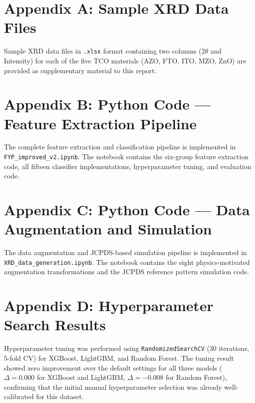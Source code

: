 \documentclass[12pt, oneside]{article} %
\begin{document}
\newpage


\begin{appendices}

\section*{Appendix A: Sample XRD Data Files}
\label{app:A}

Sample XRD data files in \texttt{.xlsx} format containing two columns ($2\theta$ and Intensity) for each of the five TCO materials (AZO, FTO, ITO, MZO, ZnO) are provided as supplementary material to this report.


\section*{Appendix B: Python Code --- Feature Extraction Pipeline}
\label{app:B}

The complete feature extraction and classification pipeline is implemented in \texttt{FYP\_improved\_v2.ipynb}. The notebook contains the six-group feature extraction code, all fifteen classifier implementations, hyperparameter tuning, and evaluation code.


\section*{Appendix C: Python Code --- Data Augmentation and Simulation}
\label{app:C}

The data augmentation and JCPDS-based simulation pipeline is implemented in \texttt{XRD\_data\_generation.ipynb}. The notebook contains the eight physics-motivated augmentation transformations and the JCPDS reference pattern simulation code.


\section*{Appendix D: Hyperparameter Search Results}
\label{app:D}

Hyperparameter tuning was performed using \texttt{RandomizedSearchCV} (30 iterations, 5-fold CV) for XGBoost, LightGBM, and Random Forest. The tuning result showed zero improvement over the default settings for all three models ($\Delta = 0.000$ for XGBoost and LightGBM, $\Delta = -0.008$ for Random Forest), confirming that the initial manual hyperparameter selection was already well-calibrated for this dataset.



\end{appendices}
\end{document}
